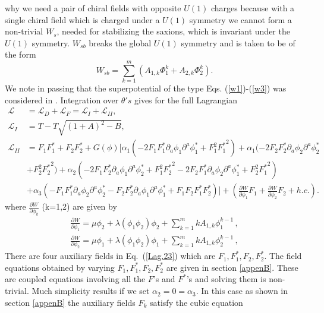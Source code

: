 \documentclass[a4paper,11pt]{article}
\def\non{\nonumber\\}
\def\non{\nonumber\\}
\begin{document}
  why we need a pair of chiral fields with opposite $U(1)$ charges because with a single chiral field which is
  charged under a $U(1)$ symmetry we cannot form a non-trivial $W_s$, needed for stabilizing the saxions,
  which is invariant under the
  $U(1)$ symmetry. $W_{sb}$ breaks the global $U(1)$ symmetry and is taken to be of the form
  \begin{equation}
    W_{sb}=\sum_{k=1}^m\left(A_{1, k}\Phi_1^k+A_{2, k}\Phi_2^k\right).
    \label{w3}
  \end{equation}
  We note in passing that the superpotential of the type Eqs. (\ref{w1})-(\ref{w3}) was considered in \cite{Nath:2017ihp,Halverson:2017deq}.
  Integration over $\theta's$ gives for the full Lagrangian
  \begin{align}
    \mathcal{L}
      &=   \mathcal{L}_D +  \mathcal{L}_F= \mathcal{L}_I + \mathcal{L}_{II},\non
    \mathcal{L}_I &= T - T \sqrt{(1+A)^2 - B},\non
    \mathcal{L}_{II}& = F_1 F^*_1 + F_2 F^*_2
      + G(\phi) \Big[ \alpha_1(-2 F_1 F^*_1 \partial_a\phi_1 \partial^a \phi^*_1
      + F_1^2 {F^*_1}^2)
      + \alpha_1 (-2 F_2 F^*_2 \partial_a\phi_2 \partial^a \phi^*_2 \non
    & + F_2^2 {F^*_2}^2)
      + \alpha_2 (-2 F_1 F^*_2 \partial_a\phi_1 \partial^a \phi^*_2
      + F_1^2 {F^*_2}^2 -2 F_2 F^*_1 \partial_a\phi_2 \partial^a \phi^*_1
      + F_2^2 {F^*_1}^2) \non
    & + \alpha_3(
      -F_1 F^*_1 \partial_a \phi_2 \partial^a \phi^*_2 - F_2 F^*_2 \partial_a \phi_1 \partial^a \phi^*_1
      + F_1 F_2 F^*_1 F^*_2) \Big]
      + \left(\frac{\partial W}{\partial \phi_1}F_1+ \frac{\partial W}{\partial \phi_2}F_2 + h.c.\right).
    \label{Lag.23}
  \end{align}
  where $\frac{\partial W}{\partial \phi_k}$ (k=1,2) are given by 
  \begin{align}
   \frac{\partial W}{\partial \phi_1}= \mu \phi_2 + \lambda (\phi_1\phi_2) \phi_2 +\sum_{k=1}^m k A_{1,k} \phi_1^{k-1}\,,\nonumber\\
   \frac{\partial W}{\partial \phi_2}= \mu \phi_1 + \lambda (\phi_1\phi_2) \phi_1 +\sum_{k=1}^m k A_{1,k} \phi_2^{k-1}\,,  \nonumber
  \end{align}
  There are four auxiliary fields in Eq.~(\ref{Lag.23}) which are $F_1, F^*_1, F_2, F^*_2$. The field equations obtained by varying
  $F_1, F^*_1, F_2, F^*_2$ are given in section \ref{appenB}. These are coupled equations
  involving all the $F$'s and $F^*$'s
  and solving them is non-trivial. Much simplicity results if we set $ \alpha_2=0=\alpha_3$.
  In this case as
  shown in section \ref{appenB} the auxiliary fields $F_k$ satisfy the cubic equation
\end{document}
